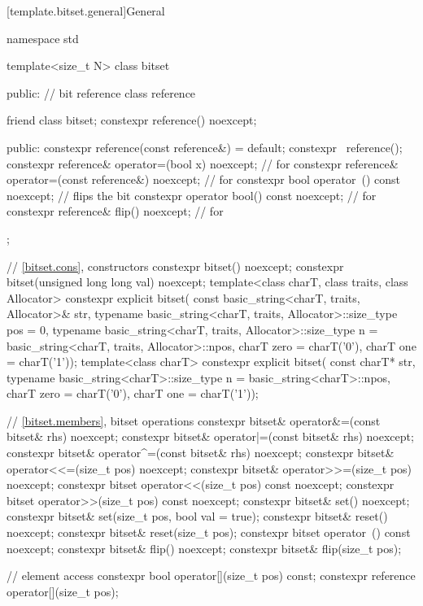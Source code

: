 [template.bitset.general]{General}%
%
\begin{codeblock}
namespace std {
  template<size_t N> class bitset {
  public:
    // bit reference
    class reference {
      friend class bitset;
      constexpr reference() noexcept;

    public:
      constexpr reference(const reference&) = default;
      constexpr ~reference();
      constexpr reference& operator=(bool x) noexcept;              // for 
      constexpr reference& operator=(const reference&) noexcept;    // for 
      constexpr bool operator~() const noexcept;                    // flips the bit
      constexpr operator bool() const noexcept;                     // for 
      constexpr reference& flip() noexcept;                         // for 
    };

    // \ref{bitset.cons}, constructors
    constexpr bitset() noexcept;
    constexpr bitset(unsigned long long val) noexcept;
    template<class charT, class traits, class Allocator>
      constexpr explicit bitset(
        const basic_string<charT, traits, Allocator>& str,
        typename basic_string<charT, traits, Allocator>::size_type pos = 0,
        typename basic_string<charT, traits, Allocator>::size_type n
          = basic_string<charT, traits, Allocator>::npos,
        charT zero = charT('0'),
        charT one = charT('1'));
    template<class charT>
      constexpr explicit bitset(
        const charT* str,
        typename basic_string<charT>::size_type n = basic_string<charT>::npos,
        charT zero = charT('0'),
        charT one = charT('1'));

    // \ref{bitset.members}, bitset operations
    constexpr bitset& operator&=(const bitset& rhs) noexcept;
    constexpr bitset& operator|=(const bitset& rhs) noexcept;
    constexpr bitset& operator^=(const bitset& rhs) noexcept;
    constexpr bitset& operator<<=(size_t pos) noexcept;
    constexpr bitset& operator>>=(size_t pos) noexcept;
    constexpr bitset  operator<<(size_t pos) const noexcept;
    constexpr bitset  operator>>(size_t pos) const noexcept;
    constexpr bitset& set() noexcept;
    constexpr bitset& set(size_t pos, bool val = true);
    constexpr bitset& reset() noexcept;
    constexpr bitset& reset(size_t pos);
    constexpr bitset  operator~() const noexcept;
    constexpr bitset& flip() noexcept;
    constexpr bitset& flip(size_t pos);

    // element access
    constexpr bool operator[](size_t pos) const;
    constexpr reference operator[](size_t pos);

}}
\end{codeblock}

